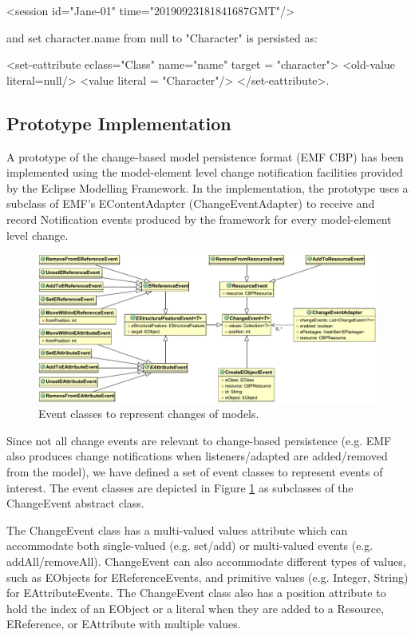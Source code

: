 \textsf{<session id="Jane-01" time="20190923181841687GMT"/>} 

and \textsf{set character.name from null to "Character"} is persisted as:

\textsf{<set-eattribute eclass="Class" name="name" 
target = "character">
<old-value literal=null/>
<value literal = "Character"/>
</set-eattribute>}.

\subsection{Prototype Implementation}
\label{sec:prototype_implementation}

A prototype \cite{epsilonlabs2019emfcbp} of the change-based model persistence format (EMF CBP) has been implemented using the model-element level change notification facilities provided by the Eclipse Modelling Framework. In the implementation, the prototype uses a subclass of EMF's \textsf{EContentAdapter} (\textsf{ChangeEventAdapter}) to receive and record \textsf{Notification} events produced by the framework for every model-element level change.

\begin{figure}[th]
  \centering
  \includegraphics[width=\linewidth]{events}
  \caption{Event classes to represent changes of models.}
  \label{fig:events}
\end{figure}

Since not all change events are relevant to change-based persistence (e.g. EMF also produces change notifications when listeners/adapted are added/removed from the model), we have defined a set of event classes to represent events of interest. The event classes are depicted in Figure \ref{fig:events} as subclasses of the \textsf{ChangeEvent} abstract class.

The \textsf{ChangeEvent} class has a multi-valued \textsf{values} attribute which can accommodate both single-valued (e.g. set/add) or multi-valued events (e.g. addAll/removeAll). \textsf{ChangeEvent} can also accommodate different types of values, such as \textsf{EObject}s for \textsf{EReferenceEvents}, and primitive values (e.g. Integer, String) for \textsf{EAttributeEvents}. The \textsf{ChangeEvent} class also has a position attribute to hold the  index of an \textsf{EObject} or a literal when they are added to a \textsf{Resource}, \textsf{EReference}, or \textsf{EAttribute} with multiple values. 

